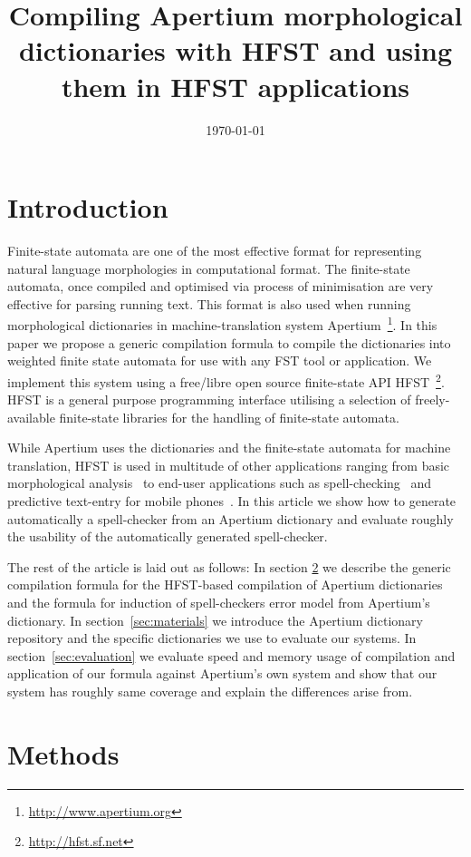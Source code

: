 \documentclass[10pt,a4paper]{article}
\title{Compiling Apertium morphological dictionaries with HFST and using them
in HFST applications}
\date{\today}
\begin{document}
\maketitleabstract

\section{Introduction}

Finite-state automata are one of the most effective format for representing
natural language morphologies in computational format. The finite-state
automata, once compiled and optimised via process of minimisation are very
effective for parsing running text. This format is also used when running
morphological dictionaries in machine-translation system
Apertium~\cite{Apertium/2011}\footnote{\url{http://www.apertium.org}}. In this
paper we propose a generic compilation formula  to compile the
dictionaries into weighted finite state automata for use with any FST 
tool or application.  We implement this system using a free/libre
open source finite-state API
HFST~\cite{hfst/2011}\footnote{\url{http://hfst.sf.net}}. HFST is a general
purpose programming interface utilising a selection of freely-available
finite-state libraries for the handling of finite-state automata.

While Apertium uses the dictionaries and the finite-state automata for machine
translation, HFST is used in multitude of other applications ranging from
basic morphological analysis~\cite{hfst/2011}
to end-user applications such as spell-checking~\cite{pirinen/2010/lrec} and
predictive text-entry for mobile phones~\cite{silfverberg/2011/cla}. In this
article we show how to generate automatically a spell-checker from an Apertium
dictionary and evaluate roughly the usability of the automatically generated
spell-checker.

The rest of the article is laid out as follows: In section \ref{sec:methods}
we describe the generic compilation formula for the HFST-based compilation of
Apertium dictionaries and the formula for induction of spell-checkers error
model from Apertium's dictionary. In section~\ref{sec:materials} we introduce
the Apertium dictionary repository and the specific dictionaries we use to
evaluate our systems. In section~\ref{sec:evaluation} we evaluate speed and
memory usage of compilation and application of our formula against Apertium's
own system and show that our system has roughly same coverage and explain
the differences arise from.

\section{Methods}
\label{sec:methods}
\end{document}
